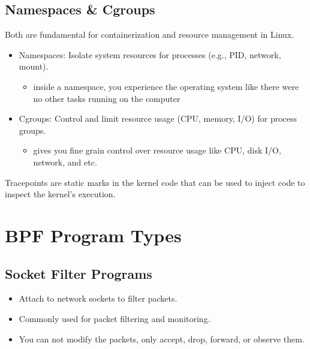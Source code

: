 \documentclass[a4paper,12pt]{article}
\begin{document}
\subsection{Namespaces \& Cgroups}
Both are fundamental for containerization and resource management in Linux. 
\begin{itemize}
    \item Namespaces: Isolate system resources for processes (e.g., PID, network, mount).
    \begin{itemize}
        \item inside a namespace, you experience the operating system like there were no other tasks running on the computer
    \end{itemize}
    \item Cgroups: Control and limit resource usage (CPU, memory, I/O) for process groups.
    \begin{itemize}
        \item gives you fine grain control over resource usage like CPU, disk I/O, network, and etc.
    \end{itemize}
\end{itemize}

Tracepoints are static marks in the kernel code that can be used to inject code to inspect the kernel's execution.

\section{BPF Program Types}

\subsection{Socket Filter Programs}
\begin{itemize}
    \item Attach to network sockets to filter packets.
    \item Commonly used for packet filtering and monitoring.
    \item You can not modify the packets, only accept, drop, forward, or observe them.
\end{itemize}
\end{document}

